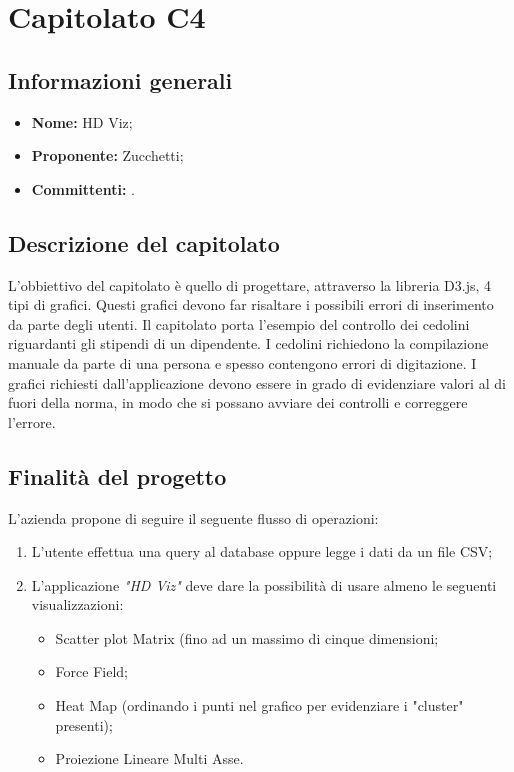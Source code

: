 \section{Capitolato C4}

\subsection{Informazioni generali}
\begin{itemize}
\item \textbf{Nome:} HD Viz;
\item \textbf{Proponente:} Zucchetti;
\item \textbf{Committenti:} \committenti{}.
\end{itemize}

\subsection{Descrizione del capitolato}
L'obbiettivo del capitolato è quello di progettare, attraverso la libreria D3.js, 4 tipi di grafici. Questi grafici devono far risaltare i possibili errori di inserimento da parte degli utenti.
Il capitolato porta l'esempio del controllo dei cedolini riguardanti gli stipendi di un dipendente. I cedolini richiedono la compilazione manuale da parte di una persona e spesso contengono errori di digitazione. I grafici richiesti dall'applicazione devono essere in grado di evidenziare valori al di fuori della norma, in modo che si possano avviare dei controlli e correggere l'errore.

\subsection{Finalità del progetto}
L'azienda propone di seguire il seguente flusso di operazioni:
\begin{enumerate}
\item L'utente effettua una query al database oppure legge i dati da un file CSV;
\item L'applicazione \textit{"HD Viz"} deve dare la possibilità di usare almeno le seguenti visualizzazioni:
	\begin{itemize}
	\item Scatter plot Matrix (fino ad un massimo di cinque dimensioni;
	\item Force Field;
	\item Heat Map (ordinando i punti nel grafico per evidenziare i "cluster" presenti);
	\item Proiezione Lineare Multi Asse.
	\end{itemize}
\end{enumerate}

